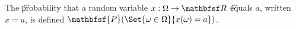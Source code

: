 
The \t{probability} that a random variable $x: \Omega  \to \R $ \t{equals} $a$, written $x = a$, is defined $\mathbfsf{P} (\Set{\omega  \in \Omega }{x(\omega ) = a})$.

\blankpage

